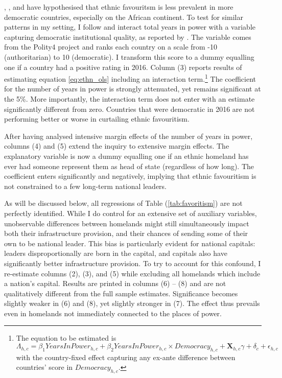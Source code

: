 \documentclass[11pt, oneside]{article}   	%
\let\oldref\ref
\renewcommand{\ref}[1]{(\oldref{#1})}
\begin{document}
\cite{DeLuca_Ethnicfavoritismaxiom_2018}, \cite{Hodler_RegionalFavoritism_2014}, and \cite{burgess_value_2015} have hypothesised that ethnic favouritsm is less prevalent in more democratic countries, especially on the African continent. To test for similar patterns in my setting, I follow \citeauthor{DeLuca_Ethnicfavoritismaxiom_2018} and interact total years in power with a variable capturing democratic institutional quality, as reported by \cite{Marshall_PolityProjectCenter_2015}. The variable comes from the Polity4 project and ranks each country on a scale from -10 (authoritarian) to 10 (democratic). I transform this score to a dummy equalling one if a country had a positive rating in 2016. Column (3) reports results of estimating equation \eqref{eq:ethn_ols} including an interaction term.\footnote{The equation to be estimated is \begin{equation*}
  \Lambda_{h,c} = \beta_{1} YearsInPower_{h,c} + \beta_{2} YearsInPower_{h,c}\times Democracy_{h,c} + \textbf{X}_{h,c}\gamma + \delta_{c} + \epsilon_{h,c}
\end{equation*} with the country-fixed effect capturing any ex-ante difference between countries' score in $Democracy_{h,c}$.} The coefficient for the number of years in power is strongly attenuated, yet remains significant at the 5\%. More importantly, the interaction term does not enter with an estimate significantly different from zero. Countries that were democratic in 2016 are not performing better or worse in curtailing ethnic favouritism.

After having analysed intensive margin effects of the number of years in power, columns (4) and (5) extend the inquiry to extensive margin effects. The explanatory variable is now a dummy equalling one if an ethnic homeland has ever had someone represent them as head of state (regardless of how long). The coefficient enters significantly and negatively, implying that ethnic favouritism is not constrained to a few long-term national leaders.

As will be discussed below, all regressions of Table \ref{tab:favoritism} are not perfectly identified. While I do control for an extensive set of auxiliary variables, unobservable differences between homelands might still simultaneously impact both their infrastructure provision, and their chances of sending some of their own to be national leader. This bias is particularly evident for national capitals: leaders disproportionally are born in the capital, and capitals also have significantly better infrastructure provision. To try to account for this confound, I re-estimate columns (2), (3), and (5) while excluding all homelands which include a nation's capital. Results are printed in columns (6) -- (8) and are not qualitatively different from the full sample estimates. Significance becomes slightly weaker in (6) and (8), yet slightly stronger in (7). The effect thus prevails even in homelands not immediately connected to the places of power.
\end{document}
